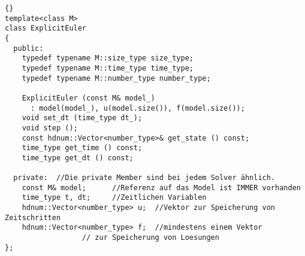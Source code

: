 \documentclass[a4paper,11pt]{article}
\theoremstyle{definition}
\begin{document}
{\footnotesize{\begin{lstlisting}{}
template<class M>
class ExplicitEuler
{
  public:
    typedef typename M::size_type size_type;
    typedef typename M::time_type time_type;
    typedef typename M::number_type number_type;

    ExplicitEuler (const M& model_)
      : model(model_), u(model.size()), f(model.size());
    void set_dt (time_type dt_);
    void step ();
    const hdnum::Vector<number_type>& get_state () const;
    time_type get_time () const;
    time_type get_dt () const;

  private:  //Die private Member sind bei jedem Solver ähnlich.
    const M& model;      //Referenz auf das Model ist IMMER vorhanden
    time_type t, dt;     //Zeitlichen Variablen
    hdnum::Vector<number_type> u;  //Vektor zur Speicherung von Zeitschritten
    hdnum::Vector<number_type> f;  //mindestens einem Vektor
                  // zur Speicherung von Loesungen
};
\end{lstlisting}}}
\end{document}
